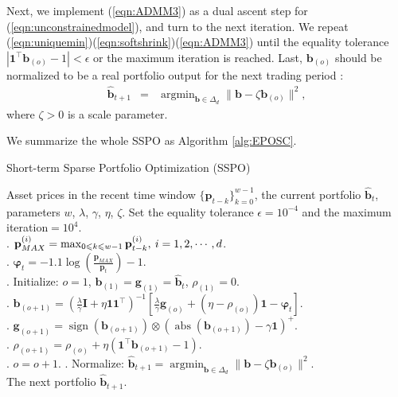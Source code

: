 \documentclass[twoside,11pt]{article}
\DeclareMathOperator*{\argmin}{argmin}
\DeclareMathOperator*{\sign}{sign}
\DeclareMathOperator*{\abs}{abs}
\begin{document}
Next, we implement (\ref{eqn:ADMM3}) as a dual ascent step for (\ref{eqn:unconstrainedmodel}), and turn to the next iteration. We repeat (\ref{eqn:uniquemin})(\ref{eqn:softshrink})(\ref{eqn:ADMM3}) until the equality tolerance $|\mathbf{1}^\top\mathbf{b}_{(o)}-1|<\epsilon$ or the maximum iteration is reached. Last, $\mathbf{b}_{(o)}$ should be normalized to be a real portfolio output for the next trading period \citep{simplexproject}:
\begin{eqnarray}
\label{eqn:newnormalization}
\hat{\mathbf{b}}_{t+1}&=&\argmin_{\mathbf{b} \in \Delta_d} \|\mathbf{b}-\zeta\mathbf{b}_{(o)}\|^2,
\end{eqnarray}
where $\zeta>0$ is a scale parameter.


We summarize the whole SSPO as Algorithm \ref{alg:EPOSC}.
\begin{algorithm}
\caption{Short-term Sparse Portfolio Optimization (SSPO)}
\label{alg:EPOSC}
\begin{algorithmic}
\REQUIRE Asset prices in the recent time window $\{\mathbf{p}_{t-k}\}_{k=0}^{w-1}$, the current portfolio $\hat{\mathbf{b}}_{t}$, parameters $w$, $\lambda$, $\gamma$, $\eta$, $\zeta$. Set the equality tolerance $\epsilon=10^{-4}$ and the maximum iteration$=10^4$.\\
. $\mathbf{p}_{MAX}^{(i)}= \max_{0\leqslant k\leqslant w-1} \mathbf{p}_{t-k}^{(i)}, \: i=1,2,\cdots, d$.\\
. $\bm{\varphi}_t=-1.1\log \left(\frac{\mathbf{p}_{MAX}}{\mathbf{p}_{t}}\right)-1$. \\
. Initialize: $o=1$, $\mathbf{b}_{(1)}=\mathbf{g}_{(1)}=\hat{\mathbf{b}}_{t}$, $\rho_{(1)}=0$.\\
\REPEAT
{}. $\mathbf{b}_{(o+1)}{=}\left( \frac{\lambda}{\gamma}\mathbf{I}{+}\eta\mathbf{1}\mathbf{1}^\top \right)^{-1}\left[  \frac{\lambda}{\gamma}\mathbf{g}_{(o)}{+}(\eta{-}\rho_{(o)})\mathbf{1}{-}\bm{\varphi}_t  \right].$\\
. $\mathbf{g}_{(o+1)}=\sign(\mathbf{b}_{(o+1)})\otimes (\abs(\mathbf{b}_{(o+1)})-\gamma\mathbf{1})^+$.\\
. $\rho_{(o+1)}=\rho_{(o)}+\eta(\mathbf{1}^\top\mathbf{b}_{(o+1)}-1)$.\\
. $o=o+1$.
. Normalize: $\hat{\mathbf{b}}_{t+1}=\argmin_{\mathbf{b} \in \Delta_d} \|\mathbf{b}-\zeta\mathbf{b}_{(o)}\|^2$.\\
\ENSURE The next portfolio $\hat{\mathbf{b}}_{t+1}$.
\end{algorithmic}
\end{algorithm}
\end{document}
